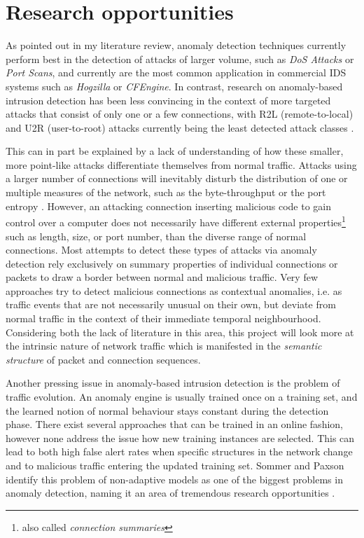 \documentclass[a4paper,12pt,twoside]{report}
\begin{document}
\section{Research opportunities}

As pointed out in my literature review, anomaly detection techniques currently perform best in the detection of attacks of larger volume, such as \textit{DoS Attacks} or \textit{Port Scans}, and currently are the most common application in commercial IDS systems such as \textit{Hogzilla} or \textit{CFEngine}. In contrast, research on anomaly-based intrusion detection has been less convincing in the context of more targeted attacks that consist of only one or a few connections, with R2L (remote-to-local) and U2R (user-to-root) attacks currently being the least detected attack classes \cite{nisioti2018intrusion}. 

This can in part be explained by a lack of understanding of how these smaller, more point-like attacks differentiate themselves from normal traffic. Attacks using a larger number of connections will inevitably disturb the  distribution of one or multiple measures of the network, such as the byte-throughput or the port entropy \cite{lakhina2005mining}. However, an attacking connection inserting malicious code to gain control over a computer does not necessarily have different external properties\footnote{also called \textit{connection summaries}} such as length, size, or port number, than the diverse range of normal connections. Most attempts to detect these types of attacks via anomaly detection rely exclusively on summary properties of individual connections or packets to draw a border between normal and malicious traffic. Very few approaches try to detect malicious connections as contextual anomalies, i.e. as traffic events that are not necessarily unusual on their own, but deviate from normal traffic in the context of their immediate temporal neighbourhood. Considering both the lack of literature in this area, this project will look more at the intrinsic nature of network traffic which is manifested in the \textit{semantic structure} of packet and connection sequences. 

Another pressing issue in anomaly-based intrusion detection is the problem of traffic evolution. An anomaly engine is usually trained once on a training set, and the learned notion of normal behaviour stays constant during the detection phase. There exist several approaches that can be trained in an online fashion, however none address the issue how new training instances are selected. This can lead to both high false alert rates when specific structures in the network change and to malicious traffic entering the updated training set. Sommer and Paxson identify this problem of non-adaptive models as one of the biggest problems in anomaly detection, naming it an area of tremendous research opportunities \cite{sommer_outside_2010}.
\end{document}
